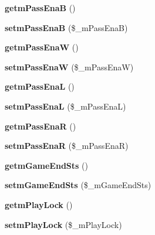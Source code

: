 \begin{DoxyCompactItemize}
{\bfseries getm\+Pass\+EnaB} ()
\item 
\mbox{\label{class_reversi_play_a815a48f29873f7cbd68e01463debced0}} 
{\bfseries setm\+Pass\+EnaB} (\$\+\_\+m\+Pass\+EnaB)
\item 
\mbox{\label{class_reversi_play_a9046f25adb88265698a1a177fc777a62}} 
{\bfseries getm\+Pass\+EnaW} ()
\item 
\mbox{\label{class_reversi_play_a198f8569bdaae8b5065a4ff5833e3dda}} 
{\bfseries setm\+Pass\+EnaW} (\$\+\_\+m\+Pass\+EnaW)
\item 
\mbox{\label{class_reversi_play_a8c52b516d55ee5ad328b7c652818b05a}} 
{\bfseries getm\+Pass\+EnaL} ()
\item 
\mbox{\label{class_reversi_play_a8cf65e1b5ffed9da0890ff2c21362a7e}} 
{\bfseries setm\+Pass\+EnaL} (\$\+\_\+m\+Pass\+EnaL)
\item 
\mbox{\label{class_reversi_play_a61b5d71d69e8e3641812c82ac98c9587}} 
{\bfseries getm\+Pass\+EnaR} ()
\item 
\mbox{\label{class_reversi_play_a8dbcf6f29086358b5b1563919bf54b96}} 
{\bfseries setm\+Pass\+EnaR} (\$\+\_\+m\+Pass\+EnaR)
\item 
\mbox{\label{class_reversi_play_a2350821625a7704d36197624bb75e27d}} 
{\bfseries getm\+Game\+End\+Sts} ()
\item 
\mbox{\label{class_reversi_play_ace5a14aa4f29b9a47529463811d4d050}} 
{\bfseries setm\+Game\+End\+Sts} (\$\+\_\+m\+Game\+End\+Sts)
\item 
\mbox{\label{class_reversi_play_a841dc46dc62803961828f2e6df32c153}} 
{\bfseries getm\+Play\+Lock} ()
\item 
\mbox{\label{class_reversi_play_a047a4279abe3efb123cf773fd7e1d662}} 
{\bfseries setm\+Play\+Lock} (\$\+\_\+m\+Play\+Lock)
\item 
\mbox{\label{class_reversi_play_ae16ed16b02256ae8cc6fab04eaf4b18b}} 

\end{DoxyCompactItemize}
